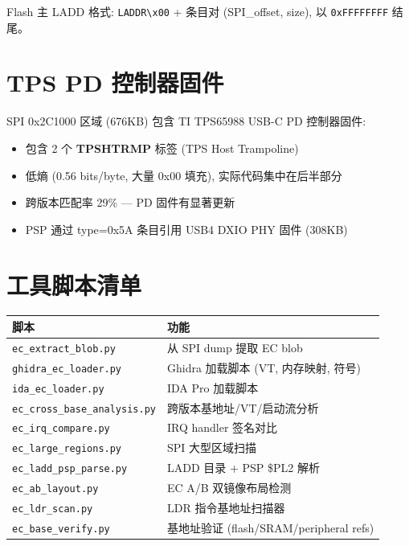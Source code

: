 \documentclass[a4paper,11pt,fontset=none]{ctexart}
\begin{document}
Flash 主 LADD 格式: \texttt{LADDR\textbackslash{}x00} + 条目对 (SPI\_offset, size), 以 \texttt{0xFFFFFFFF} 结尾。

\section{TPS PD 控制器固件}

SPI 0x2C1000 区域 (676KB) 包含 TI TPS65988 USB-C PD 控制器固件:

\begin{itemize}[nosep]
  \item 包含 2 个 \textbf{TPSHTRMP} 标签 (TPS Host Trampoline)
  \item 低熵 (0.56 bits/byte, 大量 0x00 填充), 实际代码集中在后半部分
  \item 跨版本匹配率 29\% — PD 固件有显著更新
  \item PSP 通过 type=0x5A 条目引用 USB4 DXIO PHY 固件 (308KB)
\end{itemize}

\section{工具脚本清单}

\begin{longtable}{p{5cm} p{8cm}}
  \toprule
  \textbf{脚本} & \textbf{功能} \\
  \midrule
  \endhead
  \texttt{ec\_extract\_blob.py} & 从 SPI dump 提取 EC blob \\
  \texttt{ghidra\_ec\_loader.py} & Ghidra 加载脚本 (VT, 内存映射, 符号) \\
  \texttt{ida\_ec\_loader.py} & IDA Pro 加载脚本 \\
  \texttt{ec\_cross\_base\_analysis.py} & 跨版本基地址/VT/启动流分析 \\
  \texttt{ec\_irq\_compare.py} & IRQ handler 签名对比 \\
  \texttt{ec\_large\_regions.py} & SPI 大型区域扫描 \\
  \texttt{ec\_ladd\_psp\_parse.py} & LADD 目录 + PSP \$PL2 解析 \\
  \texttt{ec\_ab\_layout.py} & EC A/B 双镜像布局检测 \\
  \texttt{ec\_ldr\_scan.py} & LDR 指令基地址扫描器 \\
  \texttt{ec\_base\_verify.py} & 基地址验证 (flash/SRAM/peripheral refs) \\
  \bottomrule
\end{longtable}
\end{document}
